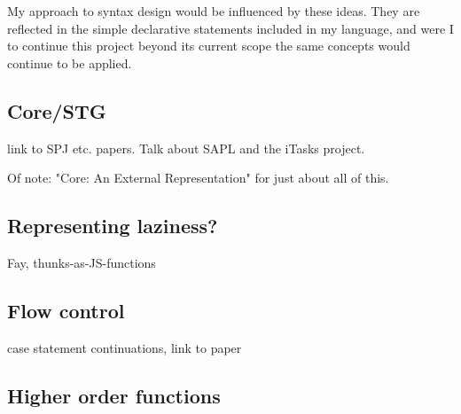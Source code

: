 \documentclass[11pt]{article}
\begin{document}
My approach to syntax design would be influenced by these ideas. They are reflected 
in the simple declarative statements included in my language, and were I to continue
this project beyond its current scope the same concepts would continue to be applied.


\subsection{Core/STG}
link to SPJ etc. papers. Talk about SAPL and the iTasks project.

Of note: "Core: An External Representation" for just about all of this.

\subsection{Representing laziness?}
Fay, thunks-as-JS-functions

\subsection{Flow control}
case statement continuations, link to paper

\subsection{Higher order functions}
\end{document}
